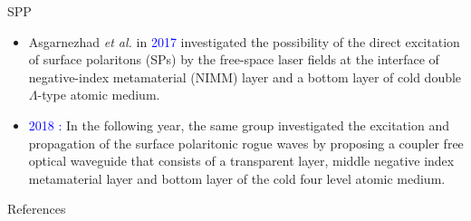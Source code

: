 \documentclass[9pt,aspectratio94]{beamer}
\begin{document}
\begin{frame}{SPP}
\begin{itemize}
\item Asgarnezhad \textit{et al.} in \textcolor{blue}{2017} investigated the possibility of the direct excitation of surface polaritons (SPs) by the free-space laser fields at the interface of negative-index metamaterial (NIMM) layer and a bottom layer of cold double $\Lambda$-type atomic medium. 
\item \textcolor{blue}{2018 :} In the following year, the same group investigated the excitation and propagation of the surface polaritonic rogue waves by proposing a coupler free optical waveguide that consists of a transparent layer, middle negative index metamaterial layer and bottom layer of the cold four level atomic medium. 
   \end{itemize}
\end{frame}
   \begin{frame}[allowframebreaks]{References}

\end{frame}
\end{document}
